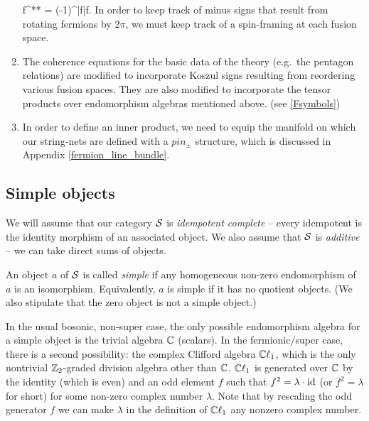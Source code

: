 \begin{enumerate}
	\be f^{**} = (-1)^{|f|}f.\ee
	In order to keep track of minus signs that result from rotating fermions by $2\pi$, we must keep track of a spin-framing at each fusion space. 
	\item The coherence equations for the basic data of the theory (e.g.\ the pentagon relations) are modified to incorporate  
	 Koszul signs resulting from reordering various fusion spaces. 
	 They are also modified to incorporate the tensor products over endomorphism algebras mentioned above. (see \ref{Fsymbols})
	\item In order to define an inner product, we need to equip the manifold on which our string-nets are 
	defined with a $pin_\pm$ structure, which is discussed in Appendix \ref{fermion_line_bundle}.
\end{enumerate}





\subsection{Simple objects}  \label{def_sob_ss}

We will assume that our category $\mathcal{S}$ is {\it idempotent complete} -- 
every idempotent is the identity morphism of an associated object.
We also assume that $\mathcal{S}$ is {\it additive} -- we can take direct sums of objects.

An object $a$ of $\mathcal{S}$ is called {\it simple} if any homogeneous non-zero endomorphism of $a$ is an isomorphism.
Equivalently, $a$ is simple if it has no quotient objects.
(We also stipulate that the zero object is not a simple object.)

In the usual bosonic, non-super case, the only possible endomorphism algebra for a simple object
is the trivial algebra $\mathbb{C}$ (scalars).
In the fermionic/super case, there is a second possibility: the complex Clifford algebra $\mathbb{C}\ell_1$, 
which is the only nontrivial $\mathbb{Z}_2$-graded division algebra other than $\mathbb{C}$.
$\mathbb{C}\ell_1$ is generated over $\mathbb{C}$ by the identity (which is even) and an odd element $f$ such that $f^2 = \lambda \cdot \text{id}$
(or $f^2 = \lambda$ for short) for some non-zero complex number $\lambda$. 
Note that by rescaling the odd generator $f$ we can make $\lambda$ in the definition of $\mathbb{C}\ell_1$ any nonzero complex number. 

